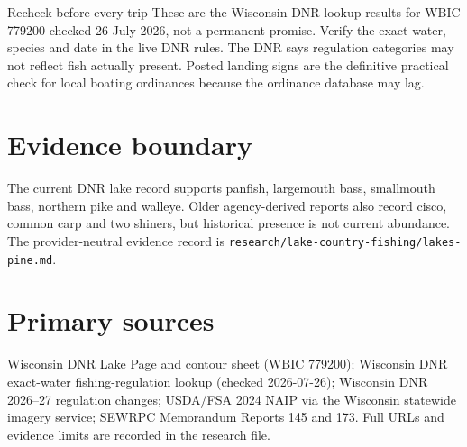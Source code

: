 \begin{teloshazard}{Recheck before every trip}
These are the Wisconsin DNR lookup results for WBIC 779200 checked 26 July
2026, not a permanent promise. Verify the exact water, species and date in the
live DNR rules. The DNR says regulation categories may not reflect fish actually
present. Posted landing signs are the definitive practical check for local
boating ordinances because the ordinance database may lag.
\end{teloshazard}

\section{Evidence boundary}

The current DNR lake record supports panfish, largemouth bass, smallmouth bass,
northern pike and walleye. Older agency-derived reports also record cisco,
common carp and two shiners, but historical presence is not current abundance.
The provider-neutral evidence record is
\texttt{research/lake-country-fishing/lakes-pine.md}.

\section{Primary sources}
\small
Wisconsin DNR Lake Page and contour sheet (WBIC 779200); Wisconsin DNR
exact-water fishing-regulation lookup (checked 2026-07-26); Wisconsin DNR
2026--27 regulation changes; USDA/FSA 2024 NAIP via the Wisconsin statewide
imagery service; SEWRPC Memorandum Reports 145 and 173. Full URLs and evidence
limits are recorded in the research file.


